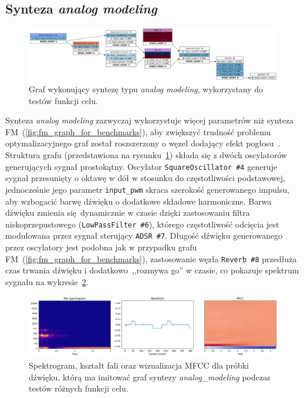 \subsection{Synteza \textit{analog modeling}}

\begin{figure}[H]
    \centering
    \includegraphics[width=1.0\linewidth]{rys03/analog_graph_for_benchmarks.png}
    \caption{
      Graf wykonujący syntezę typu \textit{analog modeling}, wykorzystany do testów funkcji celu.
    }\label{fig:analog_graph_for_benchmarks}
\end{figure}

Synteza \textit{analog modeling} zazwyczaj wykorzystuje więcej parametrów niż synteza
FM~(\ref{fig:fm_graph_for_benchmarks}), aby zwiększyć trudność problemu optymalizacyjnego
graf został roszszerzony o węzeł dodający efekt pogłosu~\cite{reverb}.
Struktura grafu (przedstawiona na rysunku~\ref{fig:analog_graph_for_benchmarks}) składa
się z dwóch oscylatorów generujących sygnał prostokątny. Oscylator \texttt{SquareOscillator \#4}
generuje sygnał przesunięty o oktawę w dół w stosunku do częstotliwości podstawowej, jednocześnie
jego parametr \texttt{input\_pwm} skraca szerokość generowanego impulsu, aby wzbogacić barwę dźwięku
o dodatkowe składowe harmoniczne. Barwa dźwięku zmienia się dynamicznie w czasie dzięki 
zastosowaniu filtra niskoprzepustowego (\texttt{LowPassFilter \#6}), którego
częstotliwość odcięcia jest modulowana przez sygnał sterujący \texttt{ADSR \#7}.
Długość dźwięku generowanego przez oscylatory jest podobna jak w przypadku
grafu FM~(\ref{fig:fm_graph_for_benchmarks}), zastosowanie węzła \texttt{Reverb \#8}
przedłuża czas trwania dźwięku i dodatkowo~,,rozmywa go'' w czasie, co pokazuje
spektrum sygnału na wykresie~\ref{fig:am_training_sample_overview}.

\begin{figure}[H]
  \centering
  \includegraphics[width=1.0\linewidth]{rys03/am_training_sample_overview.png}
  \caption{
    Spektrogram, kształt fali oraz wizualizacja MFCC dla próbki dźwięku, którą
    ma imitować graf syntezy \textit{analog\_modeling} podczas testów różnych funkcji celu.
  }\label{fig:am_training_sample_overview}
\end{figure}



